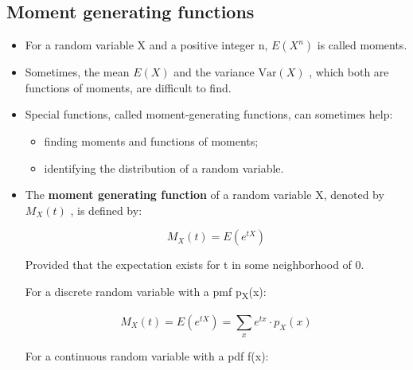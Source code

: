 \documentclass[12pt]{report}
\renewcommand{\_}{\kern-1.5pt\textunderscore\kern-1.5pt}
\begin{document}
\subsection*{Moment generating functions}
\begin{itemize}
	\item For a random variable X and a positive integer n,  \( E \left( X^{n} \right)  \)  is called moments. \par

	\item Sometimes, the mean  \( E \left( X \right)  \)  and the variance  \( \mathrm{Var} \left( X \right)  \) , which both are functions of moments, are difficult to find. \par

	\item Special functions, called moment-generating functions, can sometimes help:\par

\begin{itemize}
	\item finding moments and functions of moments;\par

	\item identifying the distribution of a random variable.\par


\end{itemize}
	\item The \textbf{moment generating function} of a random variable X, denoted by  \( M_{X} \left( t \right)  \) , is defined by:\par

 \[ M_{X} \left( t \right) =E \left( e^{tX} \right)  \] \par

Provided that the expectation exists for t in some neighborhood of 0.\par

For a discrete random variable with a pmf p\textsubscript{X}(x):\par

 \[ M_{X} \left( t \right) =E \left( e^{tX} \right) = \sum _{x}^{}e^{tx} \cdot p_{X} \left( x \right)  \] \par


\vspace{\baselineskip}
For a continuous random variable with a pdf f(x):\par


\end{itemize}
\end{document}
